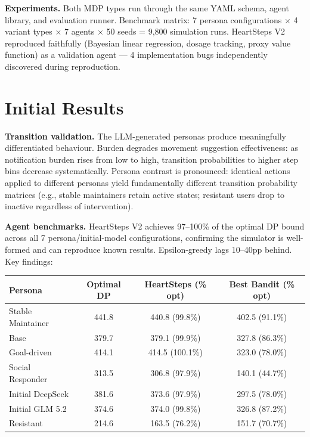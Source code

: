 \documentclass[10pt,a4paper]{article}
\begin{document}
\textbf{Experiments.} Both MDP types run through the same YAML schema, agent library, and evaluation runner. Benchmark matrix: 7 persona configurations \(\times\) 4 variant types \(\times\) 7 agents \(\times\) 50 seeds = 9,800 simulation runs. HeartSteps V2 reproduced faithfully (Bayesian linear regression, dosage tracking, proxy value function) as a validation agent --- 4 implementation bugs independently discovered during reproduction.

\section{Initial Results}

\textbf{Transition validation.} The LLM-generated personas produce meaningfully differentiated behaviour. Burden degrades movement suggestion effectiveness: as notification burden rises from low to high, transition probabilities to higher step bins decrease systematically. Persona contrast is pronounced: identical actions applied to different personas yield fundamentally different transition probability matrices (e.g., stable maintainers retain active states; resistant users drop to inactive regardless of intervention).

\textbf{Agent benchmarks.} HeartSteps V2 achieves 97--100\% of the optimal DP bound across all 7 persona/initial-model configurations, confirming the simulator is well-formed and can reproduce known results. Epsilon-greedy lags 10--40pp behind. Key findings:

\begin{table}[ht]
  \centering
  \small
  \begin{tabular}{lccc}
    \toprule
    Persona & Optimal DP & HeartSteps (\% opt) & Best Bandit (\% opt) \\
    \midrule
    Stable Maintainer & 441.8 & 440.8 (99.8\%) & 402.5 (91.1\%) \\
    Base                  & 379.7 & 379.1 (99.9\%) & 327.8 (86.3\%) \\
    Goal-driven           & 414.1 & 414.5 (100.1\%) & 323.0 (78.0\%) \\
    Social Responder      & 313.5 & 306.8 (97.9\%) & 140.1 (44.7\%) \\
    Initial DeepSeek      & 381.6 & 373.6 (97.9\%) & 297.5 (78.0\%) \\
    Initial GLM 5.2       & 374.6 & 374.0 (99.8\%) & 326.8 (87.2\%) \\
    Resistant             & 214.6 & 163.5 (76.2\%) & 151.7 (70.7\%) \\
    \bottomrule
  \end{tabular}
\end{table}
\end{document}
